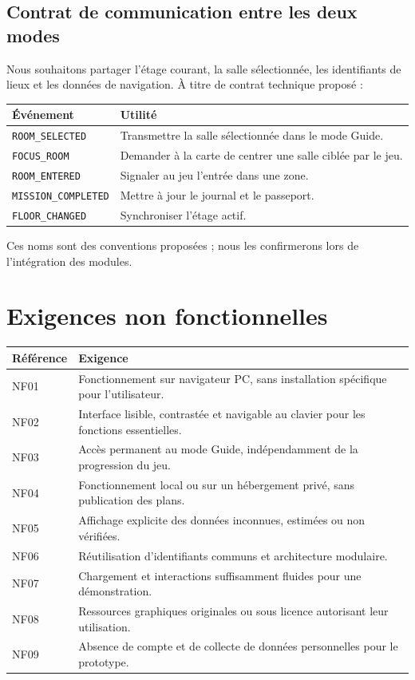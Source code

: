 \documentclass[11pt,a4paper]{article}
\begin{document}
\subsection{Contrat de communication entre les deux modes}
Nous souhaitons partager l'étage courant, la salle sélectionnée, les identifiants de lieux et les données de navigation. À titre de contrat technique proposé :
\begin{longtable}{p{}p{}}
\toprule Événement & Utilité \\ \midrule
\texttt{ROOM\_SELECTED} & Transmettre la salle sélectionnée dans le mode Guide.\\
\texttt{FOCUS\_ROOM} & Demander à la carte de centrer une salle ciblée par le jeu.\\
\texttt{ROOM\_ENTERED} & Signaler au jeu l'entrée dans une zone.\\
\texttt{MISSION\_COMPLETED} & Mettre à jour le journal et le passeport.\\
\texttt{FLOOR\_CHANGED} & Synchroniser l'étage actif.\\
\bottomrule
\end{longtable}
Ces noms sont des conventions proposées ; nous les confirmerons lors de l'intégration des modules.

\section{Exigences non fonctionnelles}
\begin{longtable}{p{}p{}}
\toprule Référence & Exigence \\ \midrule
NF01 & Fonctionnement sur navigateur PC, sans installation spécifique pour l'utilisateur.\\
NF02 & Interface lisible, contrastée et navigable au clavier pour les fonctions essentielles.\\
NF03 & Accès permanent au mode Guide, indépendamment de la progression du jeu.\\
NF04 & Fonctionnement local ou sur un hébergement privé, sans publication des plans.\\
NF05 & Affichage explicite des données inconnues, estimées ou non vérifiées.\\
NF06 & Réutilisation d'identifiants communs et architecture modulaire.\\
NF07 & Chargement et interactions suffisamment fluides pour une démonstration.\\
NF08 & Ressources graphiques originales ou sous licence autorisant leur utilisation.\\
NF09 & Absence de compte et de collecte de données personnelles pour le prototype.\\
\bottomrule
\end{longtable}
\end{document}

